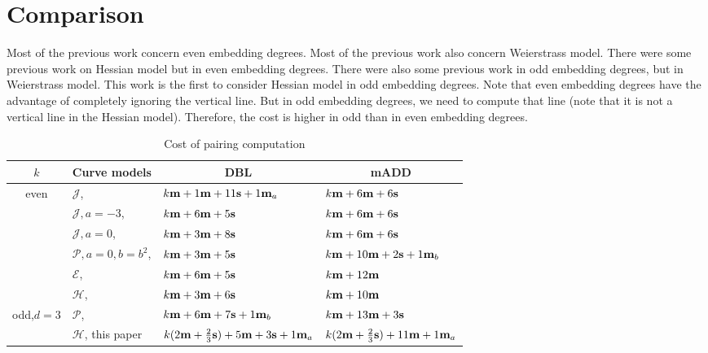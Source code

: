 \section{Comparison}

Most of the previous work concern even embedding degrees.
Most of the previous work also concern Weierstrass model.
There were some previous work on Hessian model but in even embedding degrees.
There were also some previous work in odd embedding degrees, but in Weierstrass model.
This work is the first to consider Hessian model in odd embedding degrees.
Note that even embedding degrees have the advantage of completely ignoring the vertical line.
But in odd embedding degrees, we need to compute that line (note that it is not a vertical line in the Hessian model).
Therefore, the cost is higher in odd than in even embedding degrees.



\begin{table}[h]
\centering
\caption{Cost of pairing computation}

\begin{tabular}{ l | l | l | l}
\hline
\multicolumn{1}{c|}{$k$}
&\multicolumn{1}{c|}{Curve models}	&\multicolumn{1}{c|}{DBL}	&\multicolumn{1}{c}{mADD}	\\
\hline
\multicolumn{1}{c|}{\multirow{6}{*}{even}}
&$\mathcal{J}$, \cite{2008/IonicaJoux08} \cite{2009/fastertate}
				&$k\textbf{m} + 1\textbf{m} + 11\textbf{s} + 1\textbf{m}_{a}$	&$k\textbf{m} + 6\textbf{m} + 6\textbf{s}$	\\
&$\mathcal{J},a = -3$, \cite{2009/fastertate}
				&$k\textbf{m} + 6\textbf{m} + 5\textbf{s}$		&$k\textbf{m} + 6\textbf{m} + 6\textbf{s}$	\\
&$\mathcal{J},a = 0$, \cite{2009/fastertate}		
				&$k\textbf{m} + 3\textbf{m} + 8\textbf{s}$		&$k\textbf{m} + 6\textbf{m} + 6\textbf{s}$	\\
&$\mathcal{P},a = 0, b = b^2$, \cite{2009/craig}
				&$k\textbf{m} + 3\textbf{m} + 5\textbf{s}$		&$k\textbf{m} + 10\textbf{m} + 2\textbf{s} + 1\textbf{m}_{b}$	\\
&$\mathcal{E}$, \cite{2009/fastertate}			
				&$k\textbf{m} + 6\textbf{m} + 5\textbf{s}$		&$k\textbf{m} + 12\textbf{m}$	\\
&$\mathcal{H}$, \cite{2010/Gu}	&$k\textbf{m} + 3\textbf{m} + 6\textbf{s}$		&$k\textbf{m} + 10\textbf{m}$	\\
\hline
\multicolumn{1}{c|}{\multirow{2}{*}{odd,$d{=}3$}}
&$\mathcal{P}$, \cite{2010/CLN}	&$k\textbf{m} + 6\textbf{m} + 7\textbf{s} + 1\textbf{m}_b$	&$k\textbf{m} + 13\textbf{m} + 3\textbf{s}$	\\
&$\mathcal{H}$, this paper
				&$k(2\textbf{m} + \frac{2}{3}\textbf{s}) + 5\textbf{m} + 3\textbf{s} + 1\textbf{m}_a$
									&$k(2\textbf{m} + \frac{2}{3}\textbf{s}) + 11\textbf{m} + 1\textbf{m}_a$	\\
\hline
\end{tabular}
\label{tbl-cmp}


\end{table}


